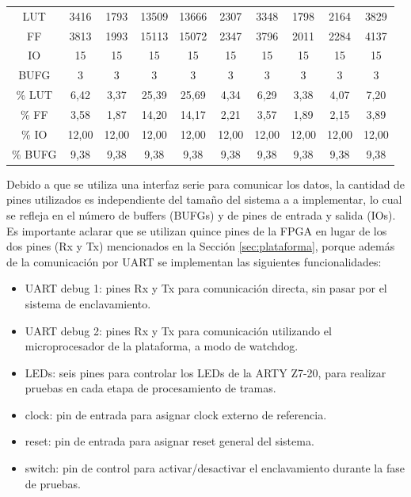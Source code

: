 \begin{table}[H]
{\begin{center}
{\begin{tabular}{ c c c c c c c c c c  }
						LUT 			& 3416  & 1793  & 13509 & 13666 & 2307  & 3348  & 1798  & 2164  & 3829\\
						FF 				& 3813  & 1993  & 15113 & 15072 & 2347  & 3796  & 2011  & 2284  & 4137\\
						IO 				& 15    & 15    & 15    & 15    & 15    & 15    & 15    & 15    & 15\\
						BUFG 			& 3     & 3     & 3     & 3     & 3     & 3     & 3     & 3     & 3\\
						\hline
						\% LUT 			& 6,42  & 3,37  & 25,39 & 25,69 & 4,34  & 6,29  & 3,38  & 4,07  & 7,20\\
						\% FF 			& 3,58  & 1,87  & 14,20 & 14,17 & 2,21  & 3,57  & 1,89  & 2,15  & 3,89\\
						\% IO 			& 12,00 & 12,00 & 12,00 & 12,00 & 12,00 & 12,00 & 12,00 & 12,00 & 12,00\\
						\% BUFG 		& 9,38  & 9,38  & 9,38  & 9,38  & 9,38  & 9,38  & 9,38  & 9,38  & 9,38\\
					\end{tabular}
				}
			\end{center}
		}    
	\end{table}
	
	Debido a que se utiliza una interfaz serie para comunicar los datos, la cantidad de pines utilizados es independiente del tamaño del sistema a a implementar, lo cual se refleja en el número de buffers (BUFGs) y de pines de entrada y salida (IOs). 
	Es importante aclarar que se utilizan quince pines de la FPGA en lugar de los dos pines (Rx y Tx) mencionados en la Sección \ref{sec:plataforma}, porque además de la comunicación por UART se implementan las siguientes funcionalidades:
	
	\begin{itemize}
		\item UART debug 1: pines Rx y Tx para comunicación directa, sin pasar por el sistema de enclavamiento.
		\item UART debug 2: pines Rx y Tx para comunicación utilizando el microprocesador de la plataforma, a modo de watchdog.
		\item LEDs: seis pines para controlar los LEDs de la ARTY Z7-20, para realizar pruebas en cada etapa de procesamiento de tramas.
		\item clock: pin de entrada para asignar clock externo de referencia.
		\item reset: pin de entrada para asignar reset general del sistema.
		\item switch: pin de control para activar/desactivar el enclavamiento durante la fase de pruebas.	
	\end{itemize}

